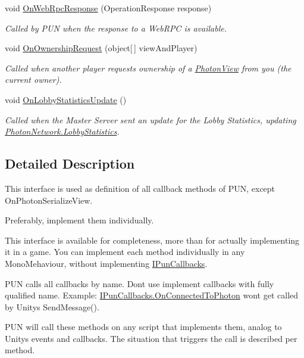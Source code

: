 \begin{DoxyCompactItemize}
void \hyperlink{interface_i_pun_callbacks_aae3221aa2d3b999574fc55a6aaee2877}{On\+Web\+Rpc\+Response} (Operation\+Response response)
\begin{DoxyCompactList}\small\item\em Called by P\+UN when the response to a Web\+R\+PC is available. \end{DoxyCompactList}\item 
void \hyperlink{interface_i_pun_callbacks_a02364f5144b6305bbffc886d530b7bd2}{On\+Ownership\+Request} (object\mbox{[}$\,$\mbox{]} view\+And\+Player)
\begin{DoxyCompactList}\small\item\em Called when another player requests ownership of a \hyperlink{class_photon_view}{Photon\+View} from you (the current owner). \end{DoxyCompactList}\item 
void \hyperlink{interface_i_pun_callbacks_a6922987e083f414d05464403e3b94bce}{On\+Lobby\+Statistics\+Update} ()
\begin{DoxyCompactList}\small\item\em Called when the Master Server sent an update for the Lobby Statistics, updating \hyperlink{class_photon_network_abdced09cccf61ae817cb97705ffce137}{Photon\+Network.\+Lobby\+Statistics}. \end{DoxyCompactList}\end{DoxyCompactItemize}


\subsection{Detailed Description}
This interface is used as definition of all callback methods of P\+UN, except On\+Photon\+Serialize\+View. 

Preferably, implement them individually. 

This interface is available for completeness, more than for actually implementing it in a game. You can implement each method individually in any Mono\+Mehaviour, without implementing \hyperlink{interface_i_pun_callbacks}{I\+Pun\+Callbacks}.

P\+UN calls all callbacks by name. Don\textquotesingle{}t use implement callbacks with fully qualified name. Example\+: \hyperlink{interface_i_pun_callbacks_aa9014980a1dc2d9befc6129668c890a2}{I\+Pun\+Callbacks.\+On\+Connected\+To\+Photon} won\textquotesingle{}t get called by Unity\textquotesingle{}s Send\+Message().

P\+UN will call these methods on any script that implements them, analog to Unity\textquotesingle{}s events and callbacks. The situation that triggers the call is described per method.

